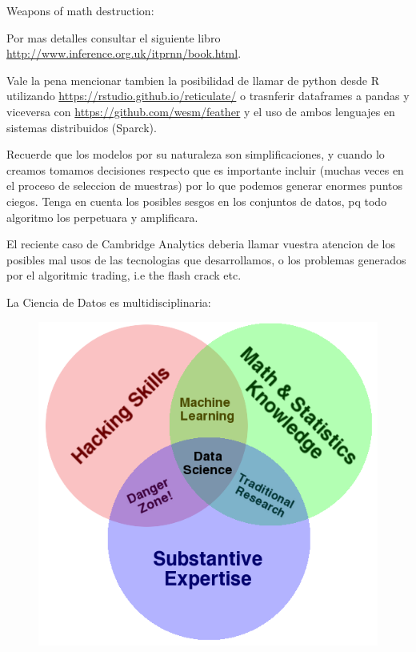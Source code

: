 \documentclass[ignorenonframetext,]{beamer}
\begin{document}
\begin{frame}

\begin{block}{Weapons of math destruction:}

Por mas detalles consultar el siguiente libro
\url{http://www.inference.org.uk/itprnn/book.html}.

Vale la pena mencionar tambien la posibilidad de llamar de python desde
R utilizando \url{https://rstudio.github.io/reticulate/} o trasnferir
dataframes a pandas y viceversa con
\url{https://github.com/wesm/feather} y el uso de ambos lenguajes en
sistemas distribuidos (Sparck).

Recuerde que los modelos por su naturaleza son simplificaciones, y
cuando lo creamos tomamos decisiones respecto que es importante incluir
(muchas veces en el proceso de seleccion de muestras) por lo que podemos
generar enormes puntos ciegos. Tenga en cuenta los posibles sesgos en
los conjuntos de datos, pq todo algoritmo los perpetuara y amplificara.

El reciente caso de Cambridge Analytics deberia llamar vuestra atencion
de los posibles mal usos de las tecnologias que desarrollamos, o los
problemas generados por el algoritmic trading, i.e the flash crack etc.

\end{block}

\end{frame}

\begin{frame}{La Ciencia de Datos es multidisciplinaria:}

\begin{figure}
\centering
\includegraphics{./Data_Science_VD.png}
\caption{}
\end{figure}

\end{frame}
\end{document}
